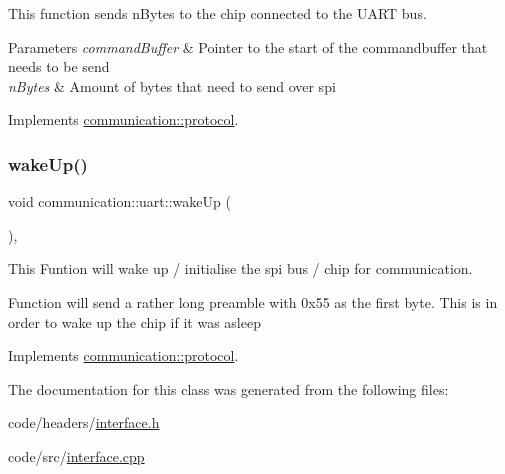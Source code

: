 This function sends n\+Bytes to the chip connected to the U\+A\+RT bus. 


\begin{DoxyParams}{Parameters}
{\em command\+Buffer} & Pointer to the start of the commandbuffer that needs to be send \\
\hline
{\em n\+Bytes} & Amount of bytes that need to send over spi \\
\hline
\end{DoxyParams}


Implements \hyperlink{classcommunication_1_1protocol_a1745c4aac1b27bac2d350be54fedc388}{communication\+::protocol}.

\mbox{\label{classcommunication_1_1uart_aea97e95d698c8738fb891e5f0d65e288}} 
\subsubsection{\texorpdfstring{wake\+Up()}{wakeUp()}}
{\footnotesize\ttfamily void communication\+::uart\+::wake\+Up (\begin{DoxyParamCaption}{ }\end{DoxyParamCaption})\hspace{0.3cm}{\ttfamily [override]}, {\ttfamily [virtual]}}



This Funtion will wake up / initialise the spi bus / chip for communication. 

Function will send a rather long preamble with 0x55 as the first byte. This is in order to wake up the chip if it was asleep 

Implements \hyperlink{classcommunication_1_1protocol_aefe3def7b92b2eae8c98bfc542e27078}{communication\+::protocol}.



The documentation for this class was generated from the following files\+:\begin{DoxyCompactItemize}
\item 
code/headers/\hyperlink{interface_8h}{interface.\+h}\item 
code/src/\hyperlink{interface_8cpp}{interface.\+cpp}\end{DoxyCompactItemize}
